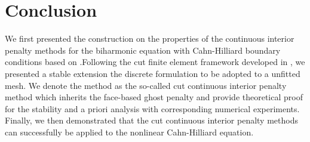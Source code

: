 
\newpage
\section{Conclusion}%
\label{sec:conclusion}

We first presented the construction on the properties of the continuous interior penalty methods for the biharmonic equation with Cahn-Hilliard boundary conditions based on \cite{feng2007fully, brenner2012}.Following the cut finite element framework developed in
\cite{gurkan2019stabilized}, we presented a stable extension the discrete formulation to be adopted to a unfitted mesh. We denote the method as the so-called cut continuous interior penalty method which inherits the face-based ghost penalty and
provide theoretical proof for the stability and a priori analysis with corresponding numerical experiments. Finally, we then demonstrated that the cut continuous interior penalty methods can successfully be applied to the nonlinear Cahn-Hilliard
equation.
